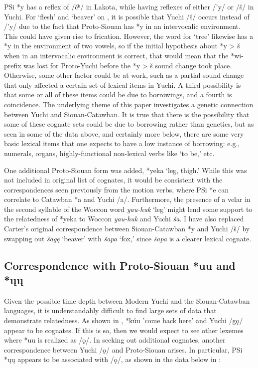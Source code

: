 \documentclass[output=paper]{LSP/langsci}
\begin{document}
PSi *y has a reflex of /\v{c}ʰ/ in Lakota, while having reflexes of either /'y/ or /\v{s}/ in Yuchi. For `flesh' and `beaver' on , it is possible that Yuchi /\v{s}/ occurs instead of /'y/ due to the fact that Proto-Siouan has *y in an intervocalic environment. This could have given rise to frication. However, the word for `tree' likewise has a *y in the environment of two vowels, so if the initial hypothesis about *y > \v{s} when in an intervocalic environment is correct, that would mean that the *wi- prefix was lost for Proto-Yuchi before the *y > \v{s} sound change took place. Otherwise, some other factor could be at work, such as a partial sound change that only affected a certain set of lexical items in Yuchi. A third possibility is that some or all of these items could be due to borrowings, and a fourth is coincidence. The underlying theme of this paper investigates a genetic connection between Yuchi and Siouan-Catawban. It is true that there is the possibility that some of these cognate sets could be due to borrowing rather than genetics, but as seen in some of the data above, and certainly more below, there are some very basic lexical items that one expects to have a low instance of borrowing: e.g., numerals, organs, highly-functional non-lexical verbs like `to be,' etc. 

One additional Proto-Siouan form was added, *yeka `leg, thigh.' While this was not included in  original list of cognates, it would be consistent with the correspondences seen previously from the motion verbs, where PSi *e can correlate to Catawban *a and Yuchi /a/. Furthermore, the presence of a velar in the second syllable of the Woccon word \emph{yau-huk} `leg' might lend some support to the relatedness of *yeka to Woccon \emph{yau-huk} and Yuchi \emph{\v{s}a}. I have also replaced Carter's original correspondence between Siouan-Catawban *y and Yuchi /\v{s}/ by swapping out \emph{\v{s}ag\k{e}} `beaver' with \emph{\v{s}apa} `fox,' since \emph{\v{s}apa} is a clearer lexical cognate.

\subsection{Correspondence with Proto-Siouan *uu and *\k{u}\k{u}}

Given the possible time depth between Modern Yuchi and the Siouan-Catawban languages, it is understandably difficult to find large sets of data that demonstrate relatedness. As shown in , *k\'uu 'come back here' and Yuchi /g\k{o}/ appear to be cognates. If this is so, then we would expect to see other lexemes where *uu is realized as /\k{o}/. In seeking out additional cognates, another correspondence between Yuchi /\k{o}/ and Proto-Siouan arises. In particular, PSi *\k{u}\k{u} appears to be associated with /\k{o}/, as shown in the data below in :
\end{document}
